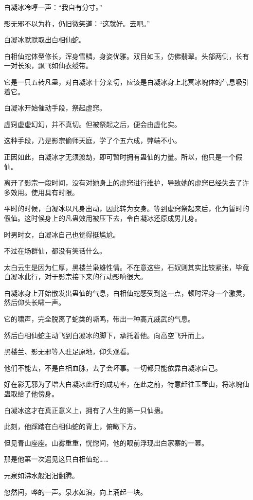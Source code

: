 \begin{this_body}
白凝冰冷哼一声：“我自有分寸。”

影无邪不以为杵，仍旧微笑道：“这就好。去吧。”

白凝冰默默取出白相仙蛇。

白相仙蛇体型修长，浑身雪鳞，身姿优雅。双目如玉，仿佛翡翠。头部两侧，长有一对长须，飘飞如仙衣绶带。

它是一只五转凡蛊，对白凝冰十分亲切，应该是白凝冰身上北冥冰魄体的气息吸引着它。

白凝冰开始催动手段，祭起虚窍。

虚窍虚虚幻幻，并不真切。但被祭起之后，便会由虚化实。

这种手段，乃是影宗偷师天庭，学了个五六成，弊端不小。

正因如此，白凝冰才无须渡劫，即可暂时拥有蛊仙的力量。所以，他只是一个假仙。

离开了影宗一段时间，没有对她身上的虚窍进行维护，导致她的虚窍已经失去了许多效用。使用具有时限。

平时的时候，白凝冰以凡身出动，因此转为女身。等到虚窍祭起来后，化为暂时的假仙。这时候身上的凡蛊效用被压下去，令白凝冰还原成男儿身。

时男时女，白凝冰自己也觉得挺尴尬。

不过在场群仙，都没有笑话什么。

太白云生是因为仁厚，黑楼兰枭雄性情。不在意这些，石奴则其实比较紧张，毕竟白凝冰此行，对于影宗接下来的行动影响很大。

白凝冰身上开始散发出蛊仙的气息，白相仙蛇感受到这一点，顿时浑身一个激灵，然后仰头长啸一声。

它的啸声，完全脱离了蛇类的嘶鸣，带出一种高亢威武的气息。

然后白相仙蛇主动飞到白凝冰的脚下，承托着他。向高空飞升而上。

黑楼兰、影无邪等人驻足原地，仰头观看。

他们不能去，不是白相血脉，去了会坏事。一切都只能依靠白凝冰自己。

好在影无邪为了增大白凝冰此行的成功率，在此之前，特意赶往玉壶山，将冰魄仙蛊取给了他傍身。

白凝冰这才在真正意义上，拥有了人生的第一只仙蛊。

此刻，他踩踏在白相仙蛇的背上，俯瞰下方。

但见青山座座。山雾重重，恍惚间，他的眼前浮现出白家寨的一幕。

那是他第一次遇见这只白相仙蛇……

元泉如沸水般汩汩翻腾。

忽然间，哗的一声。泉水如浪，向上涌起一块。


\end{this_body}
